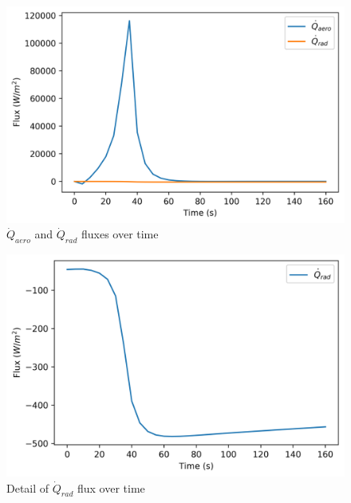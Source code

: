 \documentclass[twocolumn]{article}
\begin{document}
            \begin{subfigures}
                \label{fig:flux}
                \begin{figure}[h]
                    \includegraphics[width=\linewidth]{flux.png}
                    \caption{$\dot{Q}_{aero}$ and $\dot{Q}_{rad}$ fluxes over time}
                    \label{fig:fluxboth}
                \end{figure}
                \begin{figure}
                    \includegraphics[width=\linewidth]{fluxrad.png}
                    \caption{Detail of $\dot{Q}_{rad}$ flux over time}
                    \label{fig:fluxrad}
                \end{figure}
                
            \end{subfigures}
\end{document}
